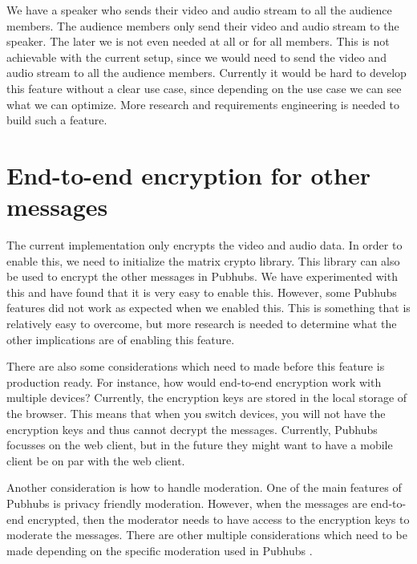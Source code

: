 \documentclass{report}
\begin{document}
We have a speaker who sends their video and audio stream to all the audience members. The audience members only send
their video and audio stream to the speaker. The later we is not even needed at all or for all members. This is not
achievable with the current setup, since we would need to send the video and audio stream to all the audience members.
Currently it would be hard to develop this feature without a clear use case, since depending on the use case we can
see what we can optimize. More research and requirements engineering is needed to build such a feature.

\section{End-to-end encryption for other messages}
The current implementation only encrypts the video and audio data. In order to enable this, we need to initialize the
matrix crypto library. This library can also be used to encrypt the other messages in Pubhubs. We have experimented
with this and have found that it is very easy to enable this. However, some Pubhubs features did not work as expected
when we enabled this. This is something that is relatively easy to overcome, but more research is needed to determine
what the other implications are of enabling this feature.

There are also some considerations which need to made before this feature is production ready.
For instance, how would end-to-end encryption work with multiple devices? Currently, the encryption keys are stored in
the local storage of the browser. This means that when you switch devices, you will not have the encryption keys and
thus cannot decrypt the messages. Currently, Pubhubs focusses on the web client, but in the future they might want to
have a mobile client be on par with the web client.

Another consideration is how to handle moderation. One of the main features of Pubhubs is privacy friendly moderation.
However, when the messages are end-to-end encrypted, then the moderator needs to have access to the encryption keys to
moderate the messages. There are other multiple considerations which need to be made depending on the specific
moderation used in Pubhubs \cite{noauthor_group_nodate}.

\newpage


\end{document}
